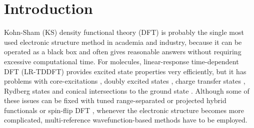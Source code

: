 \documentclass[journal=jpclcd,manuscript=letter]{achemso}
\begin{document}
\begin{abstract}
\end{abstract}


%

\section{Introduction}
Kohn-Sham (KS) density functional theory (DFT) \cite{Hohenberg1964inhomogeneous,Kohn1965} is probably the single most used electronic structure
method in academia and industry, because it can be operated as a black box and often gives
reasonable answers without requiring excessive computational time.
For molecules, linear-response \cite{Casida1995} time-dependent \cite{Runge1984} DFT (LR-TDDFT) provides excited state properties very efficiently,
but it has problems with core-excitations \cite{Imamura2006time,Janesko2023projected},
doubly excited states \cite{Levine2006conical}, charge transfer states \cite{Dreuw2003long},
Rydberg states \cite{Dreuw2003long} and conical intersections to the ground state \cite{Levine2006conical}.
Although some of these issues can be fixed with tuned \cite{Stein2009reliable} range-separated \cite{Tawada2004long}
or projected \cite{Janesko2023projected} hybrid functionals or spin-flip DFT \cite{Shao2003spin},
whenever the electronic structure becomes more complicated, multi-reference wavefunction-based methods have to be employed.
\end{document}
